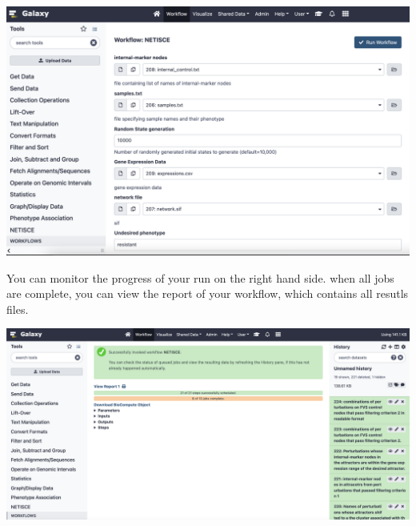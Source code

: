 \documentclass[
]{book}
\begin{document}
\begin{center}\includegraphics[width=1\linewidth]{images/galaxy6} \end{center}

You can monitor the progress of your run on the right hand side. when all jobs are complete, you can view the report of your workflow, which contains all resutls files.

\begin{center}\includegraphics[width=1\linewidth]{images/galaxy7} \end{center}

  
\end{document}
